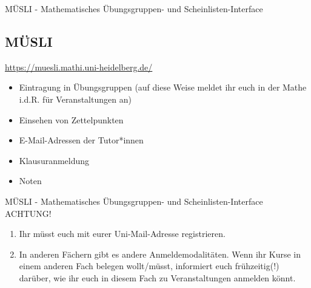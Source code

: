 
\begin{frame}{MÜSLI - Mathematisches Übungsgruppen- und Scheinlisten-Interface}
  \subsection{MÜSLI}

  \url{https://muesli.mathi.uni-heidelberg.de/}

  \begin{center}
  \end{center}

    \begin{itemize}
      \item{Eintragung in Übungsgruppen (auf diese Weise meldet ihr euch in der Mathe i.d.R. für Veranstaltungen an)}
      \item{Einsehen von Zettelpunkten}
      \item{E-Mail-Adressen der Tutor*innen}
      \item{Klausuranmeldung}
      \item{Noten}
    \end{itemize}
\end{frame}

\begin{frame}{MÜSLI - Mathematisches Übungsgruppen- und Scheinlisten-Interface}
      ACHTUNG!\\
      \begin{enumerate}
        \item{Ihr müsst euch mit eurer Uni-Mail-Adresse registrieren.}
        \item{In anderen Fächern gibt es andere Anmeldemodalitäten. Wenn ihr Kurse in einem anderen Fach belegen wollt/müsst, informiert euch frühzeitig(!) darüber, wie ihr euch in diesem Fach zu Veranstaltungen anmelden könnt.}
      \end{enumerate}
\end{frame}


